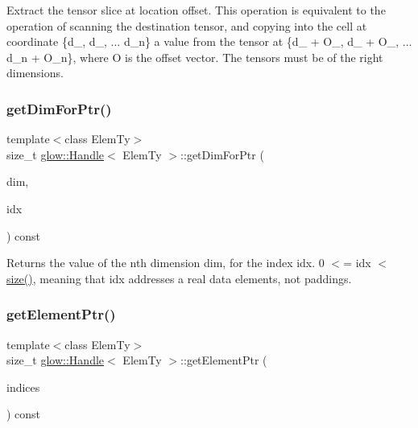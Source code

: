 Extract the tensor {\ttfamily slice} at location {\ttfamily offset}. This operation is equivalent to the operation of scanning the destination tensor, and copying into the cell at coordinate \{d\+\_, d\+\_, ... d\+\_\+n\} a value from the tensor at \{d\+\_ + O\+\_, d\+\_ + O\+\_, ... d\+\_\+n + O\+\_\+n\}, where O is the offset vector. The tensors must be of the right dimensions. \mbox{\label{classglow_1_1_handle_ad3f6b264d70213e15a0f1fc8560b5a04}} 
\subsubsection{\texorpdfstring{get\+Dim\+For\+Ptr()}{getDimForPtr()}}
{\footnotesize\ttfamily template$<$class Elem\+Ty$>$ \\
size\+\_\+t \hyperlink{classglow_1_1_handle}{glow\+::\+Handle}$<$ Elem\+Ty $>$\+::get\+Dim\+For\+Ptr (\begin{DoxyParamCaption}\item[{size\+\_\+t}]{dim,  }\item[{size\+\_\+t}]{idx }\end{DoxyParamCaption}) const\hspace{0.3cm}{\ttfamily [inline]}}

\begin{DoxyReturn}{Returns}
the value of the n\textquotesingle{}th dimension {\ttfamily dim}, for the index {\ttfamily idx}. 0 $<$= idx $<$ \hyperlink{classglow_1_1_handle_a7322ebb8b8d2d57f4ea9ec93f238b7a5}{size()}, meaning that {\ttfamily idx} addresses a real data elements, not paddings. 
\end{DoxyReturn}
\mbox{\label{classglow_1_1_handle_aa2c31f9861ab398e8e244dde4bf7a122}} 
\subsubsection{\texorpdfstring{get\+Element\+Ptr()}{getElementPtr()}}
{\footnotesize\ttfamily template$<$class Elem\+Ty$>$ \\
size\+\_\+t \hyperlink{classglow_1_1_handle}{glow\+::\+Handle}$<$ Elem\+Ty $>$\+::get\+Element\+Ptr (\begin{DoxyParamCaption}\item[{llvm\+::\+Array\+Ref$<$ size\+\_\+t $>$}]{indices }\end{DoxyParamCaption}) const\hspace{0.3cm}{\ttfamily [inline]}}

